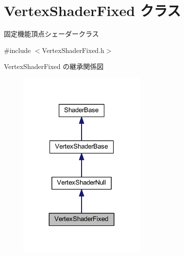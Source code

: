 \hypertarget{class_vertex_shader_fixed}{}\section{Vertex\+Shader\+Fixed クラス}
\label{class_vertex_shader_fixed}


固定機能頂点シェーダークラス  




{\ttfamily \#include $<$Vertex\+Shader\+Fixed.\+h$>$}



Vertex\+Shader\+Fixed の継承関係図\nopagebreak
\begin{figure}[H]
\begin{center}
\leavevmode
\includegraphics[width=180pt]{class_vertex_shader_fixed__inherit__graph}
\end{center}
\end{figure}
